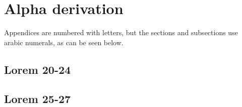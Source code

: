 \chapter{Alpha derivation}
\label{app:B}
Appendices are numbered with letters, but the sections and subsections use
arabic numerals, as can be seen below.

\section{Lorem 20-24}
\lipsum[20-24]

\section{Lorem 25-27}
\lipsum[25-27]

